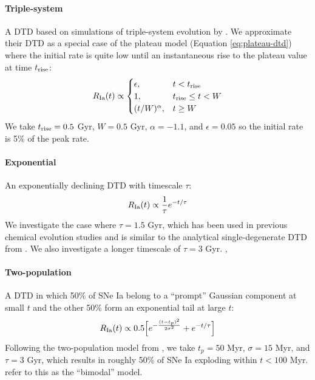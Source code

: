 \documentclass[modern,linenumbers]{aastex631}
\begin{document}
\paragraph{Triple-system} A DTD based on simulations of triple-system evolution by \citet{Rajamuthukumar2023-TripleEvolution}. We approximate their DTD as a special case of the plateau model (Equation \ref{eq:plateau-dtd}) where the initial rate is quite low until an instantaneous rise to the plateau value at time $t_{\rm rise}$:
\begin{equation}
    R_{\rm Ia}(t) \propto
    \begin{cases}
        \epsilon, & t < t_{\rm rise} \\
        1, & t_{\rm rise} \leq t < W \\
        (t / W) ^ \alpha, & t \geq W
    \end{cases}
    \label{eq:triple-dtd}
\end{equation}
We take $t_{\rm rise}=0.5$ Gyr, $W=0.5$ Gyr, $\alpha=-1.1$, and $\epsilon=0.05$ so the initial rate is 5\% of the peak rate.

\paragraph{Exponential} An exponentially declining DTD with timescale $\tau$:
\begin{equation}
    R_{\rm Ia}(t) \propto \frac{1}{\tau} e^{-t/\tau}
    \label{eq:exponential-dtd}
\end{equation}
We investigate the case where $\tau=1.5$ Gyr, which has been used in previous chemical evolution studies \citep[e.g.,][]{Schonrich2009-RadialMixing,Weinberg2017-ChemicalEquilibrium} and is similar to the analytical single-degenerate DTD from \citet{Greggio2005-AnalyticalRates}. We also investigate a longer timescale of $\tau=3$ Gyr. \citet{Matteucci1986-SupernovaEnrichment}, \citet{Stolger2020-ExponentialDTD}

\paragraph{Two-population} A DTD in which 50\% of SNe Ia belong to a ``prompt'' Gaussian component at small $t$ and the other 50\% form an exponential tail at large $t$:
\begin{equation}
    R_{\rm Ia}(t) \propto 0.5\Big[e^{-\frac{(t-t_p)^2}{2\sigma^2}} + e^{-t/\tau}\Big]
    \label{eq:prompt-dtd}
\end{equation}
Following the two-population model from \citet{Mannucci2006-TwoPopulations}, we take $t_p=50$ Myr, $\sigma=15$ Myr, and $\tau=3$ Gyr, which results in roughly 50\% of SNe Ia exploding within $t<100$ Myr. \citet{Poulhazan2018-PrecisionPollution} refer to this as the ``bimodal'' model.
\end{document}
